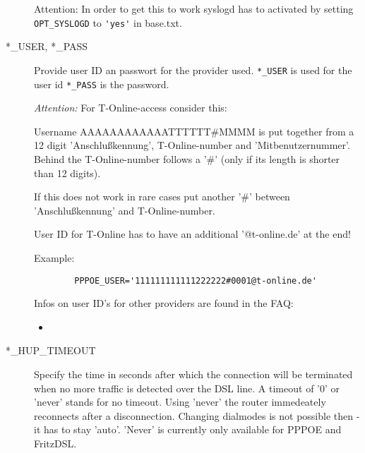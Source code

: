\begin{description}
Attention: In order to get this to work syslogd has to activated by 
setting \verb*?OPT_SYSLOGD? to \verb*?'yes'? in base.txt.

\item[*\_USER, *\_PASS]
 
Provide user ID an passwort for the provider used. 
\verb*?*_USER? is used for the user id
\verb*?*_PASS? is the password.

\emph{Attention:} For T-Online-access consider this:

Username AAAAAAAAAAAATTTTTT\#MMMM is put together from a 12 digit 'Anschlußkennung', 
T-Online-number and 'Mitbenutzernummer'. Behind the T-Online-number follows a
'\#' (only if its length is shorter than 12 digits).

If this does not work in rare cases put another '\#' between 
'Anschlußkennung' and T-Online-number.

User ID for T-Online has to have an additional '@t-online.de' at the end!

Example:

\begin{example}
\begin{verbatim}
        PPPOE_USER='111111111111222222#0001@t-online.de'
\end{verbatim}
\end{example}

Infos on user ID's for other providers are found in the FAQ:
\begin{itemize}
\item {}
\end{itemize}

\item[*\_HUP\_TIMEOUT]
 
Specify the time in seconds after which the connection will be terminated 
when no more traffic is detected over the DSL line. A timeout of '0' or 
'never' stands for no timeout. Using 'never' the router immedeately 
reconnects after a disconnection. Changing dialmodes is not 
possible then - it has to stay 'auto'. 'Never' is
currently only available for PPPOE and FritzDSL.


\end{description}
